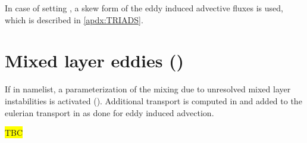 \documentclass[../main/NEMO_manual]{subfiles}
\begin{document}
In case of setting , a skew form of the eddy induced advective fluxes is used, which is described in \autoref{apdx:TRIADS}.

\section[Mixed layer eddies (\forcode{ln_mle})]{Mixed layer eddies (\protect{})}
\label{sec:LDF_mle}

\begin{listing}
  \caption{}
  \label{lst:namtra_mle}
\end{listing}

If   in  namelist, a parameterization of the mixing due to unresolved mixed layer instabilities is activated (\citet{fox-kemper.ferrari.ea_JPO08}). Additional transport is computed in  and added to the eulerian transport in  as done for eddy induced advection.

\colorbox{yellow}{TBC}

\subinc{}
\end{document}
